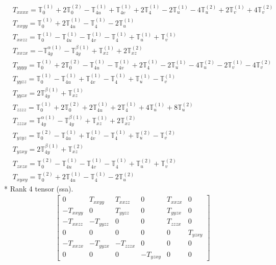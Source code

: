 \documentclass[fleqn,8pt,landscape]{jsarticle}
\begin{document}
\begin{align*}
& T_{xxxx} = \mathbb{T}_{0}^{(1)} + 2 \mathbb{T}_{0}^{(2)} - \mathbb{T}_{4u}^{(1)} + \mathbb{T}_{4v}^{(1)} + 2 \mathbb{T}_{4}^{(1)} - 2 \mathbb{T}_{u}^{(1)} - 4 \mathbb{T}_{u}^{(2)} + 2 \mathbb{T}_{v}^{(1)} + 4 \mathbb{T}_{v}^{(2)} \\
& T_{xxyy} = \mathbb{T}_{0}^{(1)} + 2 \mathbb{T}_{4u}^{(1)} - \mathbb{T}_{4}^{(1)} - 2 \mathbb{T}_{u}^{(1)} \\
& T_{xxzz} = \mathbb{T}_{0}^{(1)} - \mathbb{T}_{4u}^{(1)} - \mathbb{T}_{4v}^{(1)} - \mathbb{T}_{4}^{(1)} + \mathbb{T}_{u}^{(1)} + \mathbb{T}_{v}^{(1)} \\
& T_{xxzx} = - \mathbb{T}_{4y}^{\alpha(1)} - \mathbb{T}_{4y}^{\beta(1)} + \mathbb{T}_{xz}^{(1)} + 2 \mathbb{T}_{xz}^{(2)} \\
& T_{yyyy} = \mathbb{T}_{0}^{(1)} + 2 \mathbb{T}_{0}^{(2)} - \mathbb{T}_{4u}^{(1)} - \mathbb{T}_{4v}^{(1)} + 2 \mathbb{T}_{4}^{(1)} - 2 \mathbb{T}_{u}^{(1)} - 4 \mathbb{T}_{u}^{(2)} - 2 \mathbb{T}_{v}^{(1)} - 4 \mathbb{T}_{v}^{(2)} \\
& T_{yyzz} = \mathbb{T}_{0}^{(1)} - \mathbb{T}_{4u}^{(1)} + \mathbb{T}_{4v}^{(1)} - \mathbb{T}_{4}^{(1)} + \mathbb{T}_{u}^{(1)} - \mathbb{T}_{v}^{(1)} \\
& T_{yyzx} = 2 \mathbb{T}_{4y}^{\beta(1)} + \mathbb{T}_{xz}^{(1)} \\
& T_{zzzz} = \mathbb{T}_{0}^{(1)} + 2 \mathbb{T}_{0}^{(2)} + 2 \mathbb{T}_{4u}^{(1)} + 2 \mathbb{T}_{4}^{(1)} + 4 \mathbb{T}_{u}^{(1)} + 8 \mathbb{T}_{u}^{(2)} \\
& T_{zzzx} = \mathbb{T}_{4y}^{\alpha(1)} - \mathbb{T}_{4y}^{\beta(1)} + \mathbb{T}_{xz}^{(1)} + 2 \mathbb{T}_{xz}^{(2)} \\
& T_{yzyz} = \mathbb{T}_{0}^{(2)} - \mathbb{T}_{4u}^{(1)} + \mathbb{T}_{4v}^{(1)} - \mathbb{T}_{4}^{(1)} + \mathbb{T}_{u}^{(2)} - \mathbb{T}_{v}^{(2)} \\
& T_{yzxy} = 2 \mathbb{T}_{4y}^{\beta(1)} + \mathbb{T}_{xz}^{(2)} \\
& T_{zxzx} = \mathbb{T}_{0}^{(2)} - \mathbb{T}_{4u}^{(1)} - \mathbb{T}_{4v}^{(1)} - \mathbb{T}_{4}^{(1)} + \mathbb{T}_{u}^{(2)} + \mathbb{T}_{v}^{(2)} \\
& T_{xyxy} = \mathbb{T}_{0}^{(2)} + 2 \mathbb{T}_{4u}^{(1)} - \mathbb{T}_{4}^{(1)} - 2 \mathbb{T}_{u}^{(2)}
\end{align*}
* Rank 4 tensor (ssa).
\begin{align*}
\begin{bmatrix} 0 & T_{xxyy} & T_{xxzz} & 0 & T_{xxzx} & 0 \\ - T_{xxyy} & 0 & T_{yyzz} & 0 & T_{yyzx} & 0 \\ - T_{xxzz} & - T_{yyzz} & 0 & 0 & T_{zzzx} & 0 \\ 0 & 0 & 0 & 0 & 0 & T_{yzxy} \\ - T_{xxzx} & - T_{yyzx} & - T_{zzzx} & 0 & 0 & 0 \\ 0 & 0 & 0 & - T_{yzxy} & 0 & 0 \end{bmatrix}
\end{align*}
\end{document}
